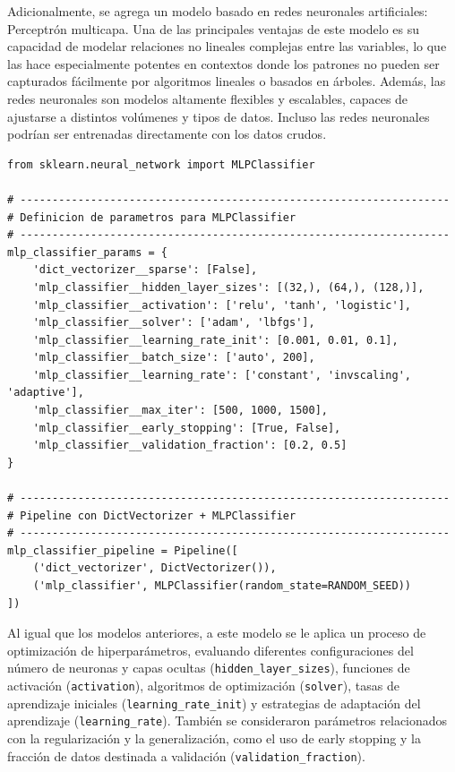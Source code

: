 \documentclass[11pt,a4paper,spanish]{book}
\numberwithin{equation}{chapter}
\numberwithin{figure}{chapter}
\begin{document}
Adicionalmente, se agrega un modelo basado en redes neuronales artificiales: Perceptrón 
multicapa. Una de las principales ventajas de este modelo es su capacidad de modelar 
relaciones no lineales complejas entre las variables, lo que las hace especialmente 
potentes en contextos donde los patrones no pueden ser capturados fácilmente por 
algoritmos lineales o basados en árboles. Además, las redes neuronales son modelos 
altamente flexibles y escalables, capaces de ajustarse a distintos volúmenes y tipos de 
datos. Incluso las redes neuronales podrían ser entrenadas directamente con los datos 
crudos. 


\vspace{5mm}
\begin{lstlisting}
from sklearn.neural_network import MLPClassifier

# -------------------------------------------------------------------
# Definicion de parametros para MLPClassifier
# -------------------------------------------------------------------
mlp_classifier_params = {
    'dict_vectorizer__sparse': [False],
    'mlp_classifier__hidden_layer_sizes': [(32,), (64,), (128,)],
    'mlp_classifier__activation': ['relu', 'tanh', 'logistic'],
    'mlp_classifier__solver': ['adam', 'lbfgs'],
    'mlp_classifier__learning_rate_init': [0.001, 0.01, 0.1],
    'mlp_classifier__batch_size': ['auto', 200],
    'mlp_classifier__learning_rate': ['constant', 'invscaling', 'adaptive'],
    'mlp_classifier__max_iter': [500, 1000, 1500],
    'mlp_classifier__early_stopping': [True, False],
    'mlp_classifier__validation_fraction': [0.2, 0.5]
}

# -------------------------------------------------------------------
# Pipeline con DictVectorizer + MLPClassifier
# -------------------------------------------------------------------
mlp_classifier_pipeline = Pipeline([
    ('dict_vectorizer', DictVectorizer()),
    ('mlp_classifier', MLPClassifier(random_state=RANDOM_SEED))
])
\end{lstlisting}

Al igual que los modelos anteriores, a este modelo se le aplica un proceso de 
optimización de hiperparámetros, evaluando diferentes configuraciones del número de 
neuronas y capas ocultas (\lstinline|hidden_layer_sizes|), funciones de activación 
(\lstinline|activation|), algoritmos de optimización (\lstinline|solver|), tasas de 
aprendizaje iniciales (\lstinline|learning_rate_init|) y estrategias de adaptación del 
aprendizaje (\lstinline|learning_rate|). También se consideraron parámetros relacionados 
con la regularización y la generalización, como el uso de early stopping y la fracción 
de datos destinada a validación (\lstinline|validation_fraction|). 
\end{document}
